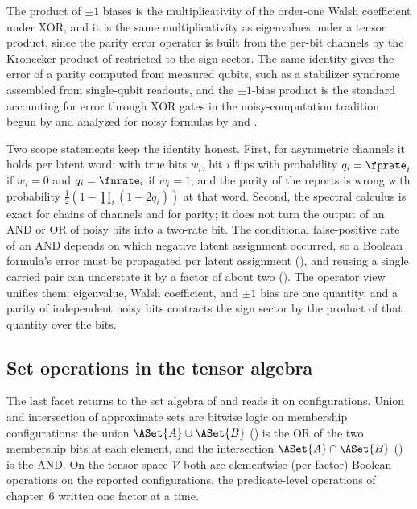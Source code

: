 The product of $\pm 1$ biases is the multiplicativity of the order-one Walsh
coefficient under XOR, and it is the same multiplicativity as eigenvalues under
a tensor product, since the parity error operator is built from the per-bit
channels by the Kronecker product of  restricted to
the sign sector. The same identity gives the error of a parity computed from measured
qubits, such as a stabilizer syndrome assembled from single-qubit
readouts, and the $\pm 1$-bias product is the standard accounting for
error through XOR gates in the noisy-computation tradition begun by
\textcite{von-neumann-1956} and analyzed for noisy formulas by
\textcite{pippenger-1988} and \textcite{evans-schulman-1999}.

Two scope statements keep the identity honest. First, for asymmetric
channels it holds per latent word: with true bits $w_i$, bit $i$ flips with
probability $q_i = \fprate_i$ if $w_i = 0$ and $q_i = \fnrate_i$ if
$w_i = 1$, and the parity of the reports is wrong with probability
$\tfrac12 (1 - \prod_i (1 - 2 q_i))$ at that word. Second, the spectral
calculus is exact for chains of channels and for parity; it does not turn
the output of an AND or OR of noisy bits into a two-rate bit. The
conditional false-positive rate of an AND depends on which negative latent
assignment occurred, so a Boolean formula's error must be propagated per
latent assignment (), and reusing a single
carried pair can understate it by a factor of about two
(). The
operator view unifies them: eigenvalue, Walsh coefficient, and $\pm 1$ bias are
one quantity, and a parity of independent noisy bits contracts the sign sector by
the product of that quantity over the bits.

\subsection*{Set operations in the tensor algebra}

The last facet returns to the set algebra of  and reads
it on configurations. Union and intersection of approximate sets are bitwise
logic on membership configurations: the union $\ASet{A} \cup \ASet{B}$
() is the OR of the two membership bits at each element,
and the intersection $\ASet{A} \cap \ASet{B}$ ()
is the AND. On the tensor space $\mathcal{V}$ both are elementwise (per-factor)
Boolean operations on the reported configurations, the predicate-level
operations of chapter~6 written one factor at a time.

